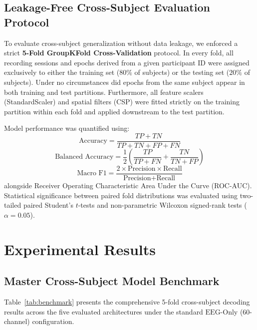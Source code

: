 \documentclass[review,12pt]{elsarticle}
\begin{document}
\subsection{Leakage-Free Cross-Subject Evaluation Protocol}
To evaluate cross-subject generalization without data leakage, we enforced a strict \textbf{5-Fold GroupKFold Cross-Validation} protocol. In every fold, all recording sessions and epochs derived from a given participant ID were assigned exclusively to either the training set ($80\%$ of subjects) or the testing set ($20\%$ of subjects). Under no circumstances did epochs from the same subject appear in both training and test partitions. Furthermore, all feature scalers (StandardScaler) and spatial filters (CSP) were fitted strictly on the training partition within each fold and applied downstream to the test partition.

Model performance was quantified using:
\begin{equation}
    \text{Accuracy} = \frac{TP + TN}{TP + TN + FP + FN}
\end{equation}
\begin{equation}
    \text{Balanced Accuracy} = \frac{1}{2} \left( \frac{TP}{TP + FN} + \frac{TN}{TN + FP} \right)
\end{equation}
\begin{equation}
    \text{Macro F1} = \frac{2 \times \text{Precision} \times \text{Recall}}{\text{Precision} + \text{Recall}}
\end{equation}
alongside Receiver Operating Characteristic Area Under the Curve (ROC-AUC). Statistical significance between paired fold distributions was evaluated using two-tailed paired Student's $t$-tests and non-parametric Wilcoxon signed-rank tests ($\alpha = 0.05$).

\section{Experimental Results}
\label{sec:results}

\subsection{Master Cross-Subject Model Benchmark}
Table~\ref{tab:benchmark} presents the comprehensive 5-fold cross-subject decoding results across the five evaluated architectures under the standard $\text{EEG-Only}$ (60-channel) configuration.
\end{document}
